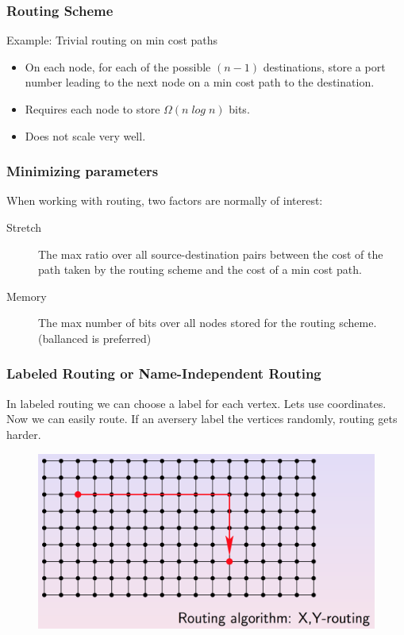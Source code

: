 \begin{frame}[fragile]
  \frametitle{Routing Scheme}
     
  \begin{block}{Example: Trivial routing on min cost paths}
      \begin{itemize}
        \item On each node, for each of the possible $(n-1)$ destinations,
        store a port number leading to the next node on a min cost path to the
        destination.
        \item Requires each node to store $\Omega (n\; log\; n)$ bits.
        \item Does not scale very well.
      \end{itemize}
  \end{block}
\end{frame}

\begin{frame}[fragile]
  \frametitle{Minimizing parameters}
  When working with routing, two factors are normally of interest:
  \begin{description}
    \item[Stretch] The max ratio over all source-destination pairs between the
        cost of the path taken by the routing scheme and the cost of a min
        cost path.
    \item[Memory] The max number of bits over all nodes stored for the routing
        scheme. (ballanced is preferred)
  \end{description}
\end{frame}

\begin{frame}[fragile]
  \frametitle{Labeled Routing or Name-Independent Routing}

  In labeled routing we can choose a label for each vertex.
  Lets use coordinates. Now we can easily route. If an aversery
  label the vertices randomly, routing gets harder.

  \begin{figure}
    \includegraphics[scale=0.3]{images/xyrouting.png} 
  \end{figure}
\end{frame}




